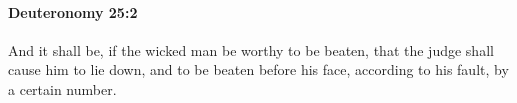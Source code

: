
		\paragraph{Deuteronomy 25:2} %
			\label{DEUTERONOMY-25-2}

			And it shall be, if the wicked man be worthy to be beaten, that the judge shall cause him to lie down, and to be beaten before his face, according to his fault, by a certain number.


